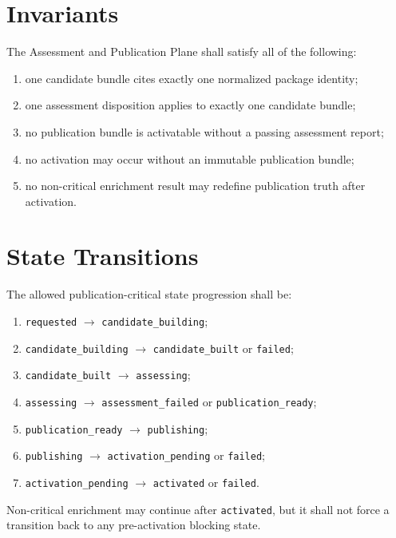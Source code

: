 \documentclass[11pt]{report}
\begin{document}
\section{Invariants}
The Assessment and Publication Plane shall satisfy all of the following:
\begin{enumerate}[leftmargin=1.2cm]
    \item one candidate bundle cites exactly one normalized package identity;
    \item one assessment disposition applies to exactly one candidate bundle;
    \item no publication bundle is activatable without a passing assessment report;
    \item no activation may occur without an immutable publication bundle;
    \item no non-critical enrichment result may redefine publication truth after activation.
\end{enumerate}

\section{State Transitions}
The allowed publication-critical state progression shall be:
\begin{enumerate}[leftmargin=1.2cm]
    \item \texttt{requested} \(\rightarrow\) \texttt{candidate\_building};
    \item \texttt{candidate\_building} \(\rightarrow\) \texttt{candidate\_built} or \texttt{failed};
    \item \texttt{candidate\_built} \(\rightarrow\) \texttt{assessing};
    \item \texttt{assessing} \(\rightarrow\) \texttt{assessment\_failed} or \texttt{publication\_ready};
    \item \texttt{publication\_ready} \(\rightarrow\) \texttt{publishing};
    \item \texttt{publishing} \(\rightarrow\) \texttt{activation\_pending} or \texttt{failed};
    \item \texttt{activation\_pending} \(\rightarrow\) \texttt{activated} or \texttt{failed}.
\end{enumerate}

Non-critical enrichment may continue after \texttt{activated}, but it shall not force a transition back to any pre-activation blocking state.
\end{document}
